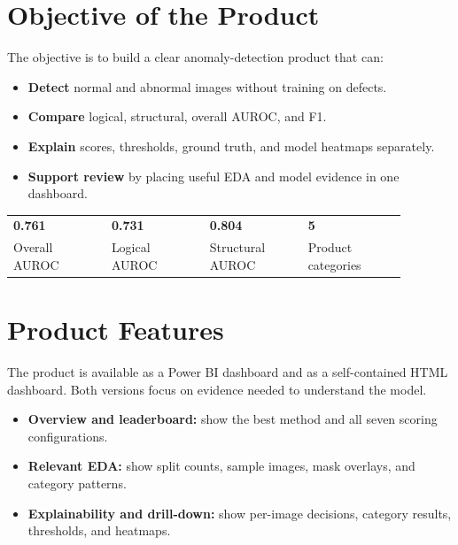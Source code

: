 \documentclass[10pt]{article}
\begin{document}
\section{Objective of the Product}
The objective is to build a clear anomaly-detection product that can:
\begin{itemize}
\item \textbf{Detect} normal and abnormal images without training on defects.
\item \textbf{Compare} logical, structural, overall AUROC, and F1.
\item \textbf{Explain} scores, thresholds, ground truth, and model heatmaps separately.
\item \textbf{Support review} by placing useful EDA and model evidence in one dashboard.
\end{itemize}

\begin{center}
\begin{tabular}{>{\centering\arraybackslash}p{0.22\linewidth}
                >{\centering\arraybackslash}p{0.22\linewidth}
                >{\centering\arraybackslash}p{0.22\linewidth}
                >{\centering\arraybackslash}p{0.22\linewidth}}
\textbf{\large 0.761} & \textbf{\large 0.731} & \textbf{\large 0.804} & \textbf{\large 5}\\
\footnotesize Overall AUROC & \footnotesize Logical AUROC &
\footnotesize Structural AUROC & \footnotesize Product categories
\end{tabular}
\end{center}

\newpage
\section{Product Features}
The product is available as a Power BI dashboard and as a self-contained HTML
dashboard. Both versions focus on evidence needed to understand the model.
\begin{itemize}
\item \textbf{Overview and leaderboard:} show the best method and all seven scoring configurations.
\item \textbf{Relevant EDA:} show split counts, sample images, mask overlays, and category patterns.
\item \textbf{Explainability and drill-down:} show per-image decisions, category results, thresholds, and heatmaps.
\end{itemize}
\end{document}
